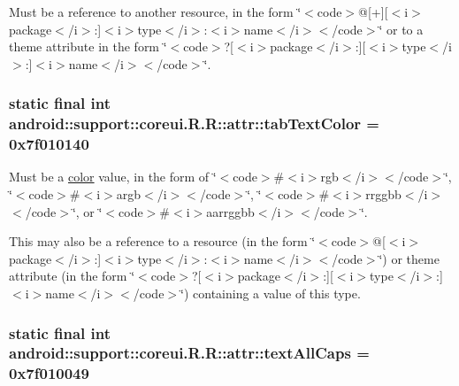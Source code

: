 Must be a reference to another resource, in the form \char`\"{}$<$code$>$@\mbox{[}+\mbox{]}\mbox{[}$<$i$>$package$<$/i$>$:\mbox{]}$<$i$>$type$<$/i$>$:$<$i$>$name$<$/i$>$$<$/code$>$\char`\"{} or to a theme attribute in the form \char`\"{}$<$code$>$?\mbox{[}$<$i$>$package$<$/i$>$:\mbox{]}\mbox{[}$<$i$>$type$<$/i$>$:\mbox{]}$<$i$>$name$<$/i$>$$<$/code$>$\char`\"{}. \hypertarget{classandroid_1_1support_1_1coreui_1_1_r_1_1attr_fc4839ee69b10d180941a956f12e9252}{
\subsubsection[{tabTextColor}]{\setlength{\rightskip}{0pt plus 5cm}static final int android::support::coreui.R.R::attr::tabTextColor = 0x7f010140}}
\label{classandroid_1_1support_1_1coreui_1_1_r_1_1attr_fc4839ee69b10d180941a956f12e9252}


Must be a \hyperlink{classandroid_1_1support_1_1coreui_1_1_r_1_1color}{color} value, in the form of \char`\"{}$<$code$>$\#$<$i$>$rgb$<$/i$>$$<$/code$>$\char`\"{}, \char`\"{}$<$code$>$\#$<$i$>$argb$<$/i$>$$<$/code$>$\char`\"{}, \char`\"{}$<$code$>$\#$<$i$>$rrggbb$<$/i$>$$<$/code$>$\char`\"{}, or \char`\"{}$<$code$>$\#$<$i$>$aarrggbb$<$/i$>$$<$/code$>$\char`\"{}. 

This may also be a reference to a resource (in the form \char`\"{}$<$code$>$@\mbox{[}$<$i$>$package$<$/i$>$:\mbox{]}$<$i$>$type$<$/i$>$:$<$i$>$name$<$/i$>$$<$/code$>$\char`\"{}) or theme attribute (in the form \char`\"{}$<$code$>$?\mbox{[}$<$i$>$package$<$/i$>$:\mbox{]}\mbox{[}$<$i$>$type$<$/i$>$:\mbox{]}$<$i$>$name$<$/i$>$$<$/code$>$\char`\"{}) containing a value of this type. \hypertarget{classandroid_1_1support_1_1coreui_1_1_r_1_1attr_1fd8ad21bd2d6a96f2961bdd7b53aafc}{
\subsubsection[{textAllCaps}]{\setlength{\rightskip}{0pt plus 5cm}static final int android::support::coreui.R.R::attr::textAllCaps = 0x7f010049}}
\label{classandroid_1_1support_1_1coreui_1_1_r_1_1attr_1fd8ad21bd2d6a96f2961bdd7b53aafc}



